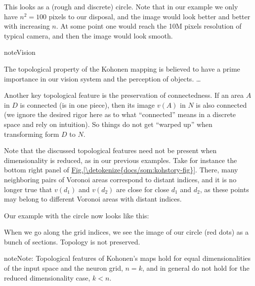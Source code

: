 \documentclass[letterpaper,10pt,english]{jupyterBook}
\begin{document}
\noindent{}

\sphinxAtStartPar
This looks as a (rough and discrete) circle. Note that in our example we only have \(n^2=100\) pixels to our disposal, and the image would look better and better with increasing \(n\). At some point one would reach the 10M pixels resolution of typical camera, and then the image would look smooth.

\begin{sphinxadmonition}{note}{Vision}

\sphinxAtStartPar
The topological property of the Kohonen mapping is believed to have a prime importance in our vision system and the perception of objects. …
\end{sphinxadmonition}

\sphinxAtStartPar
Another key topological feature is the preservation of connectedness. If an area \(A\) in \(D\) is connected (is in one piece), then its image \(v(A)\) in \(N\) is also connected (we ignore the desired rigor here as to what “connected” means in a discrete space and rely on intuition). So things do not get “warped up” when transforming form \(D\) to \(N\).

\sphinxAtStartPar
Note that the discussed topological features need not be present when dimensionality is reduced, as in our previous examples. Take for instance the bottom right panel of \hyperref[\detokenize{docs/som:kohstory-fig}]{Fig.\@ \ref{\detokenize{docs/som:kohstory-fig}}}. There, many neighboring pairs of Voronoi areas correspond to distant indices, and it is no longer true that \(v(d_1)\) and \(v(d_2)\) are close for close \(d_1\) and \(d_2\), as these points may belong to different Voronoi areas with distant indices.

\sphinxAtStartPar
Our example with the circle now looks like this:

\noindent{}

\sphinxAtStartPar
When we go along the grid indices, we see the image of our circle (red dots) as a bunch of  sections. Topology is not preserved.

\noindent{}

\begin{sphinxadmonition}{note}{Note:}
\sphinxAtStartPar
Topological features of Kohonen’s maps hold for equal dimensionalities of the input space and the neuron grid, \(n=k\), and in general do not hold for the reduced dimensionality case, \(k<n\).
\end{sphinxadmonition}
\end{document}
